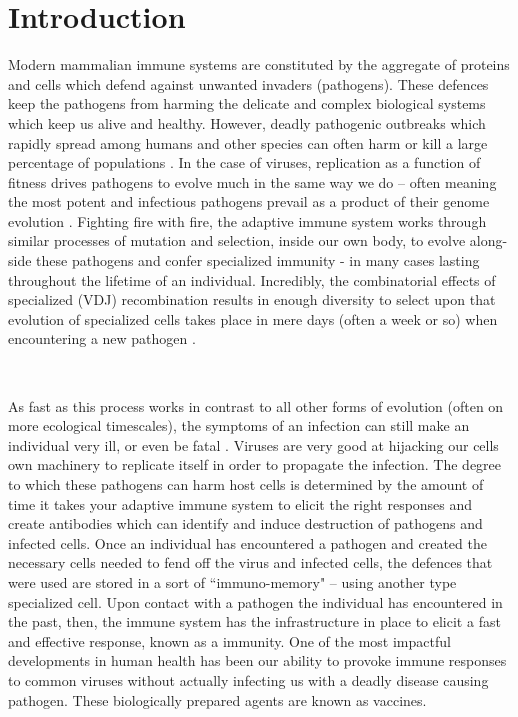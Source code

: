 \documentclass{article}
\begin{document}
\section*{Introduction}
Modern mammalian immune systems are constituted by the aggregate of proteins and cells which
defend against unwanted invaders (pathogens).
These defences keep the pathogens from harming the delicate and complex biological systems which keep us alive and healthy.
However, deadly pathogenic outbreaks which rapidly spread among humans and other species can often harm or kill a large percentage of populations \citep{Wu2020}.
In the case of viruses, replication as a function of fitness drives pathogens to evolve much in the same way we do --
often meaning the most potent and infectious pathogens prevail as a product of their genome evolution \citep{Twiddy2003, Felsenstein1981-zs}.
Fighting fire with fire, the adaptive immune system works through similar processes of mutation and selection, inside our own body,
to evolve along-side these pathogens and confer specialized immunity - in many cases lasting throughout the lifetime of an individual.
Incredibly, the combinatorial effects of specialized (VDJ) recombination results in enough diversity to select upon that evolution of specialized cells
takes place in mere days (often a week or so) when encountering a new pathogen \citep{Jung2004}.

~

As fast as this process works in contrast to all other forms of evolution (often on more ecological timescales), 
the symptoms of an infection can still make an individual very ill, or even be fatal .
Viruses are very good at hijacking our cells own machinery to replicate itself in order to propagate the infection.
The degree to which these pathogens can harm host cells is determined by the amount of time it takes your adaptive immune system to elicit the right responses and create
antibodies which can identify and induce destruction of pathogens and infected cells.
Once an individual has encountered a pathogen and created the necessary cells needed to fend off the virus and infected cells,
the defences that were used are stored in a sort of ``immuno-memory" -- using another type specialized cell.
Upon contact with a pathogen the individual has encountered in the past, then,
the immune system has the infrastructure in place to elicit a fast and effective response, known as a immunity.
One of the most impactful developments in human health has been our ability to provoke immune responses to common
viruses without actually infecting us with a deadly disease causing pathogen.
These biologically prepared agents are known as vaccines.
\end{document}
